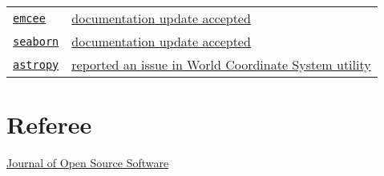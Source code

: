 \documentclass[margin]{res}
\begin{document}
\begin{resume}
\begin{tabular}{l p{4.9in}}
\href{http://dan.iel.fm/emcee/current/}{\texttt{emcee}} & \href{https://github.com/dfm/emcee/pull/212}{documentation update accepted} \\

\href{https://seaborn.pydata.org}{\texttt{seaborn}} & \href{https://github.com/mwaskom/seaborn/pull/1407}{documentation update accepted} \\

\href{http://www.astropy.org}{\texttt{astropy}} & \href{https://github.com/astropy/astropy/issues/4976}{reported an issue in World Coordinate System utility} 

\end{tabular}



\section{Referee}

\href{https://github.com/openjournals/joss-reviews/issues?utf8=✓&q=is\%3Aissue+benjaminrose+label\%3Areview}{Journal of Open Source Software}





\end{resume}
\end{document}
